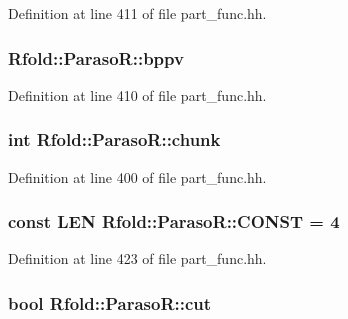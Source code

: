 Definition at line 411 of file part\+\_\+func.\+hh.

\hypertarget{class_rfold_1_1_paraso_r_a34ad7bc233e6711a93c7cb69c8ed9855}{
\subsubsection[{bppv}]{ Rfold\+::\+Paraso\+R\+::bppv}}\label{class_rfold_1_1_paraso_r_a34ad7bc233e6711a93c7cb69c8ed9855}


Definition at line 410 of file part\+\_\+func.\+hh.

\hypertarget{class_rfold_1_1_paraso_r_aafdf04b7ad506cfa1457bfefa3423e31}{
\subsubsection[{chunk}]{\setlength{\rightskip}{0pt plus 5cm}int Rfold\+::\+Paraso\+R\+::chunk}}\label{class_rfold_1_1_paraso_r_aafdf04b7ad506cfa1457bfefa3423e31}


Definition at line 400 of file part\+\_\+func.\+hh.

\hypertarget{class_rfold_1_1_paraso_r_a76b6d0bd259a9ecf1d56b8ad4830abee}{
\subsubsection[{C\+O\+N\+S\+T}]{\setlength{\rightskip}{0pt plus 5cm}const {\bf L\+E\+N} Rfold\+::\+Paraso\+R\+::\+C\+O\+N\+S\+T = 4\hspace{0.3cm}{\ttfamily [static]}}}\label{class_rfold_1_1_paraso_r_a76b6d0bd259a9ecf1d56b8ad4830abee}


Definition at line 423 of file part\+\_\+func.\+hh.

\hypertarget{class_rfold_1_1_paraso_r_afd1dd1d5fccc77e48fa36bb090be6735}{
\subsubsection[{cut}]{\setlength{\rightskip}{0pt plus 5cm}bool Rfold\+::\+Paraso\+R\+::cut}}\label{class_rfold_1_1_paraso_r_afd1dd1d5fccc77e48fa36bb090be6735}


